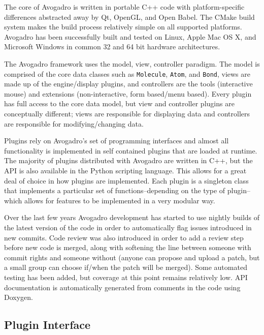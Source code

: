 \documentclass[10pt]{bmc_article}
\newenvironment{bmcformat}{\begin{raggedright}
  \baselineskip20pt\sloppy\setboolean{publ}{false}}{\end{raggedright}
  \baselineskip20pt\sloppy}
\begin{document}
\begin{bmcformat}
The core of Avogadro is written in portable C++ code with platform-specific
differences abstracted away by Qt, OpenGL, and Open Babel. The CMake build system
makes the build process relatively simple on all supported platforms. Avogadro
has been successfully built and tested on Linux, Apple Mac OS X, and Microsoft
Windows in common 32 and 64 bit hardware architectures.

The Avogadro framework uses the model, view, controller paradigm. The model
is comprised of the core data classes such as {\tt Molecule}, {\tt Atom}, and
{\tt Bond}, views are made up of the engine/display plugins, and
controllers are the tools (interactive mouse) and extensions
(non-interactive, form based/menu based). Every plugin has full access
to the core data model, but view and controller plugins are
conceptually different; views are responsible for displaying
data and controllers are responsible for modifying/changing data.

Plugins rely on Avogadro's set of programming interfaces and almost
all functionality is implemented in self contained plugins that are
loaded at runtime. The majority of plugins distributed with Avogadro
are written in C++, but the API is also available in the Python
scripting language. This allows for a great deal of choice in how
plugins are implemented. Each plugin is a singleton class that
implements a particular set of functions--depending on the type of
plugin--which allows for features to be implemented in a very modular
way.

Over the last few years Avogadro development has started to use nightly builds
of the latest version of the code in order to automatically flag issues
introduced in new commits. Code review was also introduced in order to add a
review step before new code is merged, along with softening the line between
someone with commit rights and someone without (anyone can propose and upload
a patch, but a small group can choose if/when the patch will be merged). Some
automated testing has been added, but coverage at this point remains relatively
low. API documentation is automatically generated from comments in the code
using Doxygen.

\subsection*{Plugin Interface}


\end{bmcformat}
\end{document}
